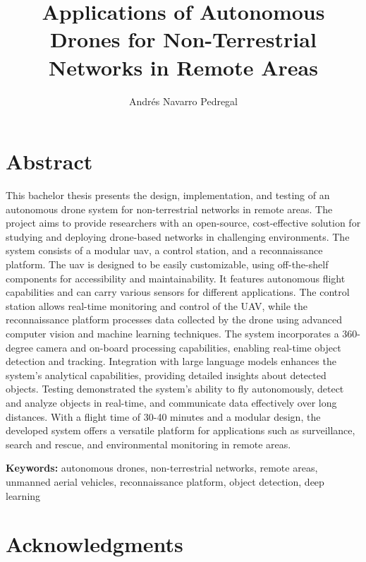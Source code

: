 \documentclass[oneside, 12pt, a4paper]{book}
\title{Applications of Autonomous Drones for Non-Terrestrial Networks in Remote Areas}
\author{Andrés Navarro Pedregal}
\begin{document}

\frontmatter
\maketitle

\blankpage%
\chapter*{Abstract}

This bachelor thesis presents the design, implementation, and testing of an autonomous drone system for non-terrestrial networks in remote areas. The project aims to provide researchers with an open-source, cost-effective solution for studying and deploying drone-based networks in challenging environments. The system consists of a modular \gls{uav}, a control station, and a reconnaissance platform. The \gls{uav} is designed to be easily customizable, using off-the-shelf components for accessibility and maintainability. It features autonomous flight capabilities and can carry various sensors for different applications. The control station allows real-time monitoring and control of the UAV, while the reconnaissance platform processes data collected by the drone using advanced computer vision and machine learning techniques. The system incorporates a 360-degree camera and on-board processing capabilities, enabling real-time object detection and tracking. Integration with large language models enhances the system's analytical capabilities, providing detailed insights about detected objects. Testing demonstrated the system's ability to fly autonomously, detect and analyze objects in real-time, and communicate data effectively over long distances. With a flight time of 30-40 minutes and a modular design, the developed system offers a versatile platform for applications such as surveillance, search and rescue, and environmental monitoring in remote areas.

\textbf{Keywords:} autonomous drones, non-terrestrial networks, remote areas, unmanned aerial vehicles, reconnaissance platform, object detection, deep learning

\blankpage%

\chapter*{Acknowledgments}
\begingroup
\let\clearpage\relax %
\end{document}

